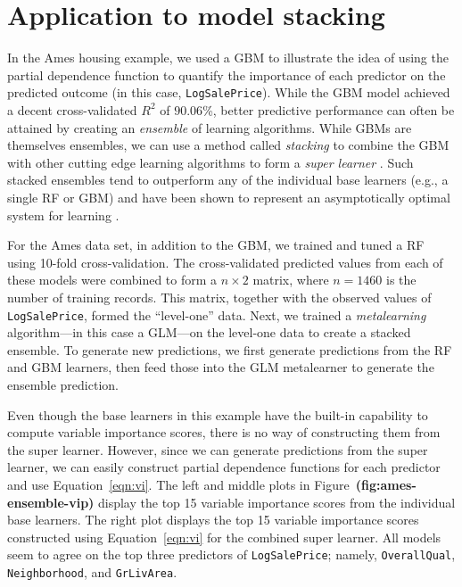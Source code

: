 \documentclass[12pt]{article}
\def\code#1{\texttt{#1}}
\def\ref#1{\textbf{(#1)}}
\begin{document}
\section{Application to model stacking}
\label{sec:ensemble}

In the Ames housing example, we used a GBM to illustrate the idea of using the partial dependence function to quantify the importance of each predictor on the predicted outcome (in this case, \code{LogSalePrice}). While the GBM model achieved a decent cross-validated $R^2$ of $90.06$\%, better predictive performance can often be attained by creating an \textit{ensemble} of learning algorithms. While GBMs are themselves ensembles, we can use a method called \textit{stacking} to combine the GBM with other cutting edge learning algorithms to form a \textit{super learner} \citep{stacked-wolpert-1992}. Such stacked ensembles tend to outperform any of the individual base learners (e.g., a single RF or GBM) and have been shown to represent an asymptotically optimal system for learning \citep{super-laan-2003}.

For the Ames data set, in addition to the GBM, we trained and tuned a RF using 10-fold cross-validation. The cross-validated predicted values from each of these models were combined to form a $n \times 2$ matrix, where $n = 1460$ is the number of training records. This matrix, together with the observed values of \code{LogSalePrice}, formed the ``level-one'' data. Next, we trained a \textit{metalearning} algorithm---in this case a GLM---on the level-one data to create a stacked ensemble. To generate new predictions, we first generate predictions from the RF and GBM learners, then feed those into the GLM metalearner to generate the ensemble prediction. 

Even though the base learners in this example have the built-in capability to compute variable importance scores, there is no way of constructing them from the super learner. However, since we can generate predictions from the super learner, we can easily construct partial dependence functions for each predictor and use Equation~\eqref{eqn:vi}. The left and middle plots in Figure~\ref{fig:ames-ensemble-vip} display the top 15 variable importance scores from the individual base learners. The right plot displays the top 15 variable importance scores constructed using Equation~\eqref{eqn:vi} for the combined super learner. All models seem to agree on the top three predictors of \code{LogSalePrice}; namely, \code{OverallQual}, \code{Neighborhood}, and \code{GrLivArea}. 
\end{document}
